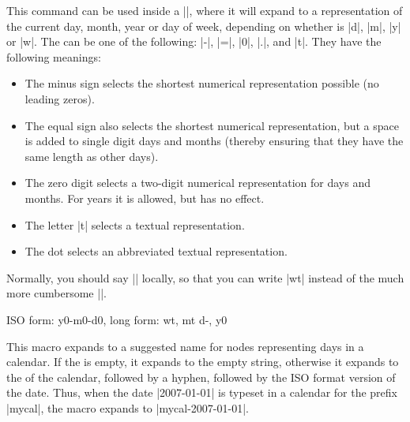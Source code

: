 \begin{command}{\pgfcalendarshorthand{}}
  \label{pgfcalendarshorthand}
  This command can be used inside a |\pgfcalendar|, where it will
  expand to a representation of the current day, month, year or day of
  week, depending on whether  is |d|, |m|, |y| or |w|. The
   can be one of the following: |-|, |=|, |0|,
  |.|, and |t|. They have the following meanings:
  \begin{itemize}
  \item The minus sign selects the shortest numerical representation
    possible (no leading zeros).
  \item The equal sign also selects the shortest numerical
    representation, but a space is added to single digit days and
    months (thereby ensuring that they have the same length as other
    days).
  \item The zero digit selects a two-digit numerical representation
    for days and months. For years it is allowed, but has no effect.
  \item The letter |t| selects a textual representation.
  \item The dot selects an abbreviated textual representation.
  \end{itemize}
  Normally, you should say |\let\%=\pgfcalendarshorthand| locally, so
  that you can write |\%wt| instead of the much more cumbersome
  ||.

\begin{codeexample}
\let\%=\pgfcalendarshorthand
{}
{ ISO form: \%y0-\%m0-\%d0, long form: \%wt, \%mt \%d-, \%y0}
\end{codeexample}
\end{command}


\begin{command}{\pgfcalendarsuggestedname}
  This macro expands to a suggested name for nodes representing days
  in a calendar. If the  is empty, it expands to the
  empty string, otherwise it expands to the  of the
  calendar, followed by a hyphen, followed by the ISO format version
  of the date. Thus, when the date |2007-01-01| is typeset in a
  calendar for the prefix |mycal|, the macro expands to
  |mycal-2007-01-01|.
\end{command}
